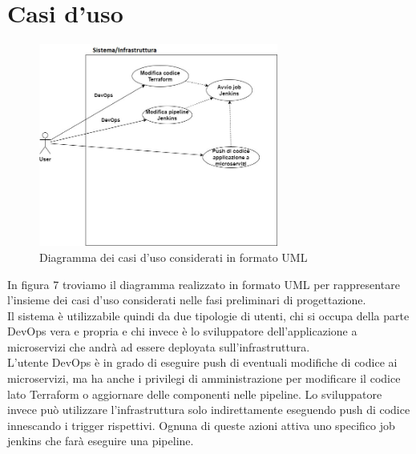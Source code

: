 \documentclass[a4paper,12pt]{report}
\begin{document}
\section{Casi d'uso}
\begin{figure}[h]
	\centering
	\includegraphics[width=0.7\textwidth]{casi_uso}
    \caption{Diagramma dei casi d'uso considerati in formato UML}
    \label{fig:casi_uso}
\end{figure} 
In figura 7 troviamo il diagramma realizzato in formato UML per rappresentare l'insieme dei casi d'uso considerati nelle fasi preliminari di progettazione.\\
Il sistema è utilizzabile quindi da due tipologie di utenti, chi si occupa della parte DevOps vera e propria e chi invece è lo sviluppatore dell'applicazione a microservizi che andrà ad essere deployata sull'infrastruttura.\\
L'utente DevOps è in grado di eseguire push di eventuali modifiche di codice ai microservizi, ma ha anche i privilegi di amministrazione per modificare il codice lato Terraform o aggiornare delle componenti nelle pipeline. Lo sviluppatore invece può utilizzare l'infrastruttura solo indirettamente eseguendo push di codice innescando i trigger rispettivi. Ognuna di queste azioni attiva uno specifico job jenkins che farà eseguire una pipeline.\\
\end{document}
